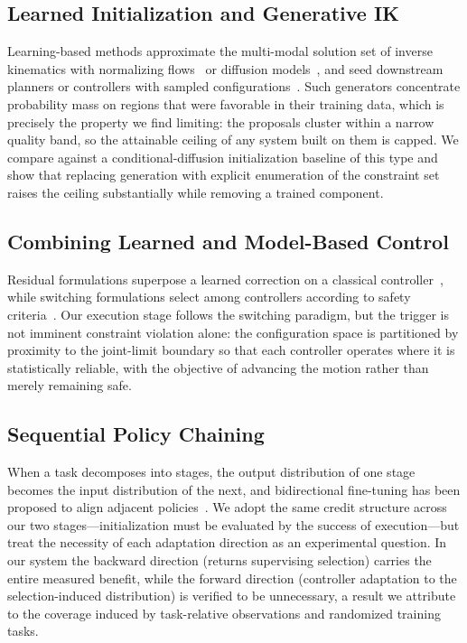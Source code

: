 \documentclass[journal]{IEEEtran}
\begin{document}
\subsection{Learned Initialization and Generative IK}
Learning-based methods approximate the multi-modal solution set of
inverse kinematics with normalizing flows~\cite{ames2022ikflow} or
diffusion models~\cite{zhang2025ikdiffuser}, and seed downstream planners
or controllers with sampled
configurations~\cite{huang2024diffusionseeder,yoon2023learning}. Such
generators concentrate probability mass on regions that were favorable in
their training data, which is precisely the property we find limiting:
the proposals cluster within a narrow quality band, so the attainable
ceiling of any system built on them is capped. We compare against a
conditional-diffusion initialization baseline of this type and show that
replacing generation with explicit enumeration of the constraint set
raises the ceiling substantially while removing a trained component.

\subsection{Combining Learned and Model-Based Control}
Residual formulations superpose a learned correction on a classical
controller~\cite{johannink2019residual,silver2018residual}, while
switching formulations select among controllers according to safety
criteria~\cite{mehmood2022black,alshiekh2018safe,kurtz2021control}. Our
execution stage follows the switching paradigm, but the trigger is not
imminent constraint violation alone: the configuration space is
partitioned by proximity to the joint-limit boundary so that each
controller operates where it is statistically reliable, with the
objective of advancing the motion rather than merely remaining safe.

\subsection{Sequential Policy Chaining}
When a task decomposes into stages, the output distribution of one stage
becomes the input distribution of the next, and bidirectional fine-tuning
has been proposed to align adjacent policies~\cite{chen2023sequential}.
We adopt the same credit structure across our two
stages---initialization must be evaluated by the success of
execution---but treat the necessity of each adaptation direction as an
experimental question. In our system the backward direction (returns
supervising selection) carries the entire measured benefit, while the
forward direction (controller adaptation to the selection-induced
distribution) is verified to be unnecessary, a result we attribute to the
coverage induced by task-relative observations and randomized training
tasks.
\end{document}
